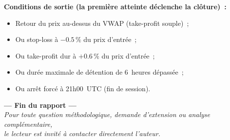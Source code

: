 \textbf{Conditions de sortie (la première atteinte déclenche la clôture)~:}
\begin{itemize}
\item Retour du prix au-dessus du VWAP (take-profit souple)~;
\item Ou stop-loss à $-0.5\,\%$ du prix d'entrée~;
\item Ou take-profit dur à $+0.6\,\%$ du prix d'entrée~;
\item Ou durée maximale de détention de 6~heures dépassée~;
\item Ou arrêt forcé à 21h00~UTC (fin de session).
\end{itemize}

\vfill

\begin{center}
\color{primary}\sffamily\Large\textbf{--- Fin du rapport ---}\\[0.5em]
{\color{slateGrey}\normalsize\itshape
Pour toute question méthodologique, demande d'extension ou analyse complémentaire,\\
le lecteur est invité à contacter directement l'auteur.}
\end{center}
